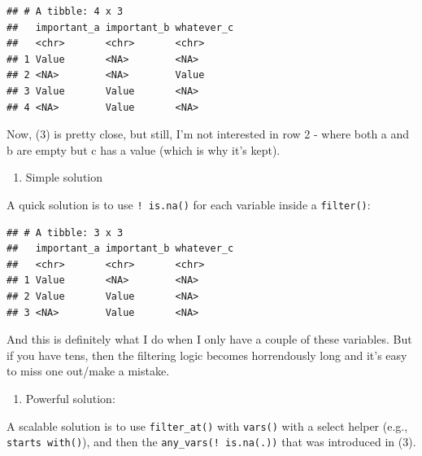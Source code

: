 \documentclass[
]{book}
\newenvironment{Shaded}{\begin{snugshade}}{\end{snugshade}}
\newcommand{\KeywordTok}[1]{\textcolor[rgb]{0.13,0.29,0.53}{\textbf{#1}}}
\newcommand{\NormalTok}[1]{#1}
\newcommand{\OperatorTok}[1]{\textcolor[rgb]{0.81,0.36,0.00}{\textbf{#1}}}
\newcommand{\StringTok}[1]{\textcolor[rgb]{0.31,0.60,0.02}{#1}}
\providecommand{\tightlist}{%
  \setlength{\itemsep}{0pt}\setlength{\parskip}{0pt}}
\begin{document}
\begin{verbatim}
## # A tibble: 4 x 3
##   important_a important_b whatever_c
##   <chr>       <chr>       <chr>     
## 1 Value       <NA>        <NA>      
## 2 <NA>        <NA>        Value     
## 3 Value       Value       <NA>      
## 4 <NA>        Value       <NA>
\end{verbatim}

Now, (3) is pretty close, but still, I'm not interested in row 2 - where both a and b are empty but c has a value (which is why it's kept).

\begin{enumerate}
\def\labelenumi{(\arabic{enumi})}
\setcounter{enumi}{3}
\tightlist
\item
  Simple solution
\end{enumerate}

A quick solution is to use \texttt{!\ is.na()} for each variable inside a \texttt{filter()}:

\begin{Shaded}
\end{Shaded}

\begin{verbatim}
## # A tibble: 3 x 3
##   important_a important_b whatever_c
##   <chr>       <chr>       <chr>     
## 1 Value       <NA>        <NA>      
## 2 Value       Value       <NA>      
## 3 <NA>        Value       <NA>
\end{verbatim}

And this is definitely what I do when I only have a couple of these variables. But if you have tens, then the filtering logic becomes horrendously long and it's easy to miss one out/make a mistake.

\begin{enumerate}
\def\labelenumi{(\arabic{enumi})}
\setcounter{enumi}{4}
\tightlist
\item
  Powerful solution:
\end{enumerate}

A scalable solution is to use \texttt{filter\_at()} with \texttt{vars()} with a select helper (e.g., \texttt{starts\ with()}), and then the \texttt{any\_vars(!\ is.na(.))} that was introduced in (3).
\end{document}
